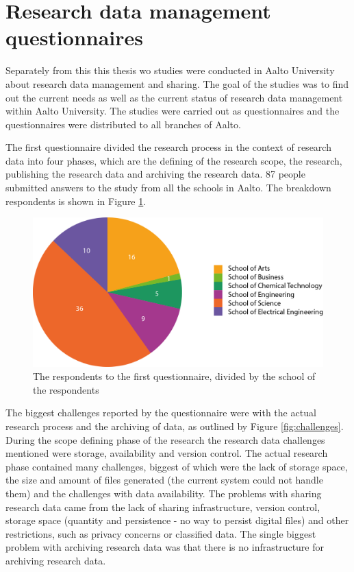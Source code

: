 \fi

\section{Research data management questionnaires}
\label{sec:questionnaire}

Separately from this this thesis wo studies were conducted in Aalto University about research data management
and sharing. The goal of the studies was to find out the current needs as well
as the current status of research data management within Aalto University. The
studies were carried out as questionnaires and the questionnaires were
distributed to all branches of Aalto.

The first questionnaire \cite{survey1} divided
the research process in the context of research data into four phases, which
are the defining of the research scope, the research, publishing the research
data and archiving the research data. 87 people submitted answers to the study from all the
schools in Aalto. The breakdown respondents is shown in Figure \ref{fig:chart_answers}.

\begin{figure}
    \begin{centering}
        \includegraphics[width=\textwidth]{images/chart_answers2}
    \end{centering}
    \caption{The respondents to the first questionnaire, divided by the school of the respondents}
    \label{fig:chart_answers}
\end{figure}

The biggest challenges reported by the questionnaire were with the actual
research process and the archiving of data, as outlined by Figure
\ref{fig:challenges}. During the scope defining phase of the research the
research data challenges mentioned were storage, availability and version
control. The actual research phase contained many challenges, biggest of which
were the lack of storage space, the size and amount of files generated (the
current system could not handle them) and the challenges with data
availability. The problems with sharing research data came from the lack of
sharing infrastructure, version control, storage space (quantity and
persistence - no way to persist digital files) and other restrictions, such
as privacy concerns or classified data. The single biggest problem with
archiving research data was that there is no infrastructure for archiving
research data.

